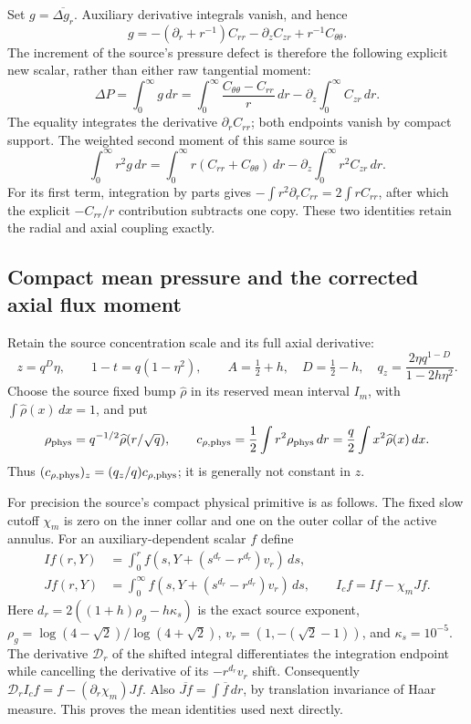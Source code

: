 Set $g=\overline{\Delta g_r}$. Auxiliary derivative integrals vanish,
and hence
\begin{equation}\label{momop:gbar}
 g=-(\partial_r+r^{-1})C_{rr}-\partial_zC_{zr}
                                    +r^{-1}C_{\theta\theta}.
\end{equation}
The increment of the source's pressure defect is therefore the
following explicit new scalar, rather than either raw tangential moment:
\begin{equation}\label{momop:deltaP}
 \Delta P=\int_0^\infty g\,dr
 =\int_0^\infty\frac{C_{\theta\theta}-C_{rr}}r\,dr
                           -\partial_z\int_0^\infty C_{zr}\,dr .
\end{equation}
The equality integrates the derivative $\partial_rC_{rr}$;
both endpoints vanish by compact support. The weighted second
moment of this same source is
\begin{equation}\label{momop:gsecond}
 \int_0^\infty r^2g\,dr
 =\int_0^\infty r(C_{rr}+C_{\theta\theta})\,dr
                   -\partial_z\int_0^\infty r^2C_{zr}\,dr .
\end{equation}
For its first term, integration by parts gives
$-\int r^2\partial_rC_{rr}=2\int rC_{rr}$, after which the
explicit $-C_{rr}/r$ contribution subtracts one copy.
These two identities retain the radial and axial coupling exactly.

\subsection{Compact mean pressure and the corrected axial flux moment}

Retain the source concentration scale and its full axial derivative:
\[
 z=q^D\eta,\qquad 1-t=q(1-\eta^2),\qquad
 A=\tfrac12+h,\quad D=\tfrac12-h,\quad
 q_z=\frac{2\eta q^{1-D}}{1-2h\eta^2}.
\]
Choose the source fixed bump $\widehat\rho$ in its reserved mean
interval $I_m$, with $\int\widehat\rho(x)\,dx=1$, and put
\[
 \rho_{\rm phys}=q^{-1/2}\widehat\rho(r/\sqrt q),\qquad
 c_{\rho,\rm phys}=\frac12\int r^2\rho_{\rm phys}\,dr
             =\frac q2\int x^2\widehat\rho(x)\,dx .
\]
Thus $(c_{\rho,\rm phys})_z=(q_z/q)c_{\rho,\rm phys}$;
it is generally not constant in $z$.

For precision the source's compact physical primitive is as follows.
The fixed slow cutoff $\chi_m$ is zero on the inner collar and one
on the outer collar of the active annulus. For an auxiliary-dependent
scalar $f$ define
\[
 \begin{split}
 I f(r,Y)&=\int_0^r
 f(s,Y+(s^{d_r}-r^{d_r})v_r)\,ds,\\
 J f(r,Y)&=\int_0^\infty
 f(s,Y+(s^{d_r}-r^{d_r})v_r)\,ds,\qquad
 I_cf=If-\chi_mJf.
 \end{split}
\]
Here $d_r=2((1+h)\rho_g-h\kappa_s)$ is the exact source exponent,
$\rho_g=\log(4-\sqrt2)/\log(4+\sqrt2)$,
$v_r=(1,-(\sqrt2-1))$, and $\kappa_s=10^{-5}$.
The derivative $\mathcal D_r$ of the shifted integral differentiates
the integration endpoint while cancelling the derivative of its
$-r^{d_r}v_r$ shift. Consequently
$\mathcal D_rI_cf=f-(\partial_r\chi_m)Jf$.
Also $\overline{Jf}=\int\overline f\,dr$, by translation invariance
of Haar measure. This proves the mean identities used next directly.

